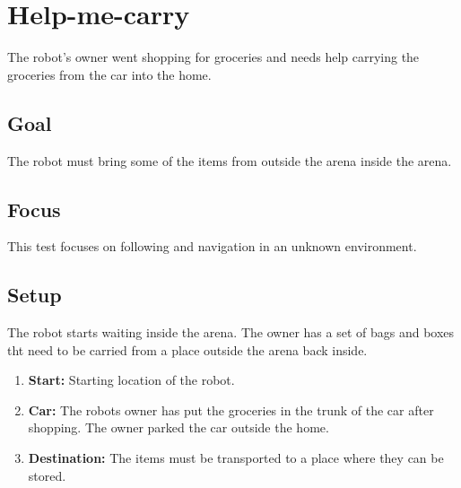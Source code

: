 \section{Help-me-carry}
The robot's owner went shopping for groceries and needs help carrying the groceries from the car into the home.

\subsection{Goal}
The robot must bring some of the items from outside the arena inside the arena.

\subsection{Focus}
This test focuses on following and navigation in an unknown environment. 

\subsection{Setup}
The robot starts waiting inside the arena. 
The owner has a set of bags and boxes tht need to be carried from a place outside the arena back inside. 

\begin{enumerate}
\item \textbf{Start:} Starting location of the robot. %
\item \textbf{Car:} The robots owner has put the groceries in the trunk of the car after shopping. The owner parked the car outside the home.
\item \textbf{Destination:} The items must be transported to a place where they can be stored.  
\end{enumerate}

